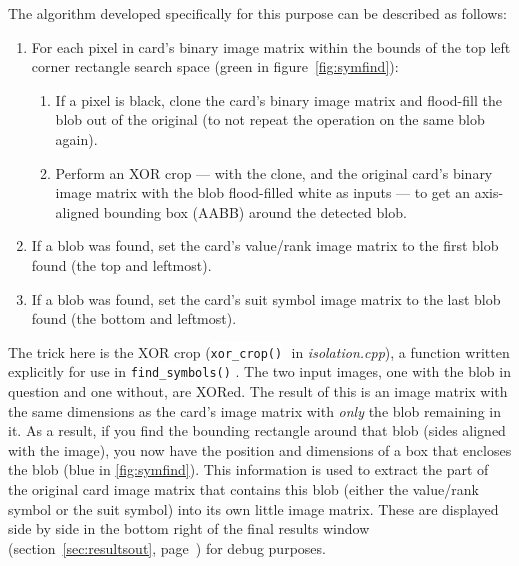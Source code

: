 \documentclass[a4paper,12pt,notitlepage]{article}
\newcommand{\secref}[1]{(section~\ref{#1}, page~\pageref{#1})}
\newcommand{\code}[1]{\colorbox{white}{\lstinline[basicstyle=\ttfamily\color{black}]|#1|} }
\begin{document}
		The algorithm developed specifically for this purpose can be described as follows:

		\begin{enumerate}
			\item For each pixel in card's binary image matrix within the bounds of the top left corner rectangle search space (green in figure~\ref{fig:symfind}):
			\begin{enumerate}
				\item If a pixel is black, clone the card's binary image matrix and flood-fill the blob out of the original (to not repeat the operation on the same blob again).
				\item Perform an XOR crop --- with the clone, and the original card's binary image matrix with the blob flood-filled white as inputs --- to get an axis-aligned bounding box (AABB) around the detected blob.
			\end{enumerate}
			\item If a blob was found, set the card's value/rank image matrix to the first blob found (the top and leftmost).
			\item If a blob was found, set the card's suit symbol image matrix to the last blob found (the bottom and leftmost).
		\end{enumerate}

		The trick here is the XOR crop (\code{xor_crop()} in \emph{isolation.cpp}), a function written explicitly for use in \code{find_symbols()}. The two input images, one with the blob in question and one without, are XORed. The result of this is an image matrix with the same dimensions as the card's image matrix with \emph{only} the blob remaining in it. As a result, if you find the bounding rectangle around that blob (sides aligned with the image), you now have the position and dimensions of a box that encloses the blob (blue in \ref{fig:symfind}). This information is used to extract the part of the original card image matrix that contains this blob (either the value/rank symbol or the suit symbol) into its own little image matrix. These are displayed side by side in the bottom right of the final results window \secref{sec:resultsout} for debug purposes.
\end{document}
